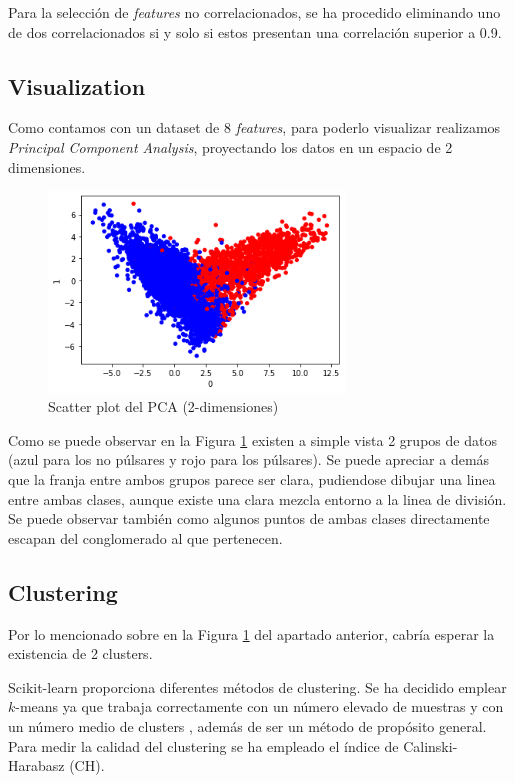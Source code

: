 \documentclass[a4paper]{article} %
\begin{document}
Para la selección de \textit{features} no correlacionados, se ha procedido eliminando uno de dos correlacionados si y solo si estos presentan una correlación superior a 0.9.

\subsection{Visualization}

Como contamos con un dataset de 8 \textit{features}, para poderlo visualizar realizamos \textit{Principal Component Analysis}, proyectando los datos en un espacio de 2 dimensiones.

\begin{figure}[H]
    \centering
    \includegraphics[width=0.7\textwidth]{PCAScatter.png}
    \caption{Scatter plot del PCA (2-dimensiones)}
    \label{ScatterPCA}
\end{figure}

Como se puede observar en la Figura \ref{ScatterPCA} existen a simple vista 2 grupos de datos (azul para los no púlsares y rojo para los púlsares). Se puede apreciar a demás que la franja entre ambos grupos parece ser clara, pudiendose dibujar una linea entre ambas clases, aunque existe una clara mezcla entorno a la linea de división. Se puede observar también como algunos puntos de ambas clases directamente escapan del conglomerado al que pertenecen.

\subsection{Clustering}

Por lo mencionado sobre en la Figura \ref{ScatterPCA} del apartado anterior, cabría esperar la existencia de 2 clusters.\vspace{5mm}

Scikit-learn proporciona diferentes métodos de clustering. Se ha decidido emplear $k$-means ya que trabaja correctamente con un número elevado de muestras y con un número medio de clusters \cite{Scikit:Clustering}, además de ser un método de propósito general. Para medir la calidad del clustering se ha empleado el índice de Calinski-Harabasz (CH). \vspace{5mm}
\end{document}
